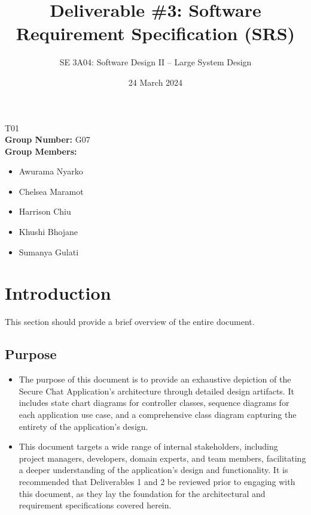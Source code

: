 \documentclass[]{article}
\title{Deliverable \#3: Software Requirement Specification (SRS)}
\author{SE 3A04: Software Design II -- Large System Design}
\date{24 March 2024}
\begin{document}
\maketitle
{} T01\\
{\bf Group Number:} G07 \\
{\bf Group Members:}
\begin{itemize}
	\item Awurama Nyarko
	\item Chelsea Maramot
	\item Harrison Chiu
	\item Khushi Bhojane
	\item Sumanya Gulati
\end{itemize}

\section{Introduction}
\label{sec:introduction}

This section should provide a brief overview of the entire document.

\subsection{Purpose}
\label{sub:purpose}
\begin{itemize}
    \item The purpose of this document is to provide an exhaustive depiction of the Secure Chat Application's architecture through detailed design artifacts. It includes state chart diagrams for controller classes, sequence diagrams for each application use case, and a comprehensive class diagram capturing the entirety of the application's design.
    \item This document targets a wide range of internal stakeholders, including project managers, developers, domain experts, and team members, facilitating a deeper understanding of the application's design and functionality. It is recommended that Deliverables 1 and 2 be reviewed prior to engaging with this document, as they lay the foundation for the architectural and requirement specifications covered herein.
\end{itemize}
\end{document}
